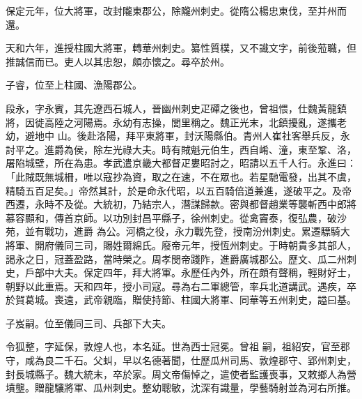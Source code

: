 \begin{pinyinscope}
 保定元年，位大將軍，改封隴東郡公，除隴州刺史。從隋公楊忠東伐，至并州而還。



 天和六年，進授柱國大將軍，轉華州刺史。纂性質樸，又不識文字，前後蒞職，但推誠信而已。吏人以其忠恕，頗亦懷之。尋卒於州。



 子睿，位至上柱國、漁陽郡公。



 段永，字永賓，其先遼西石城人，晉幽州刺史疋磾之後也，曾祖愄，仕魏黃龍鎮將，因徙高陸之河陽焉。永幼有志操，閭里稱之。魏正光末，北鎮擾亂，遂攜老幼，避地中
 山。後赴洛陽，拜平東將軍，封沃陽縣伯。青州人崔社客舉兵反，永討平之。進爵為侯，除左光祿大夫。時有賊魁元伯生，西自崤、潼，東至鞏、洛，屠陷城壁，所在為患。孝武遣京畿大都督疋婁昭討之，昭請以五千人行。永進曰：「此賊既無城柵，唯以寇抄為資，取之在速，不在眾也。若星馳電發，出其不虞，精騎五百足矣。」帝然其計，於是命永代昭，以五百騎倍道兼進，遂破平之。及帝西遷，永時不及從。大統初，乃結宗人，潛謀歸款。密與都督趙業等襲斬西中郎將慕容顯和，傳首京師。以功別封昌平縣子，徐州刺史。從禽竇泰，復弘農，破沙苑，並有戰功，進爵
 為公。河橋之役，永力戰先登，授南汾州刺史。累遷驃騎大將軍、開府儀同三司，賜姓爾綿氏。廢帝元年，授恆州刺史。于時朝貴多其部人，謁永之日，冠蓋盈路，當時榮之。周孝閔帝踐阼，進爵廣城郡公。歷文、瓜二州刺史，戶部中大夫。保定四年，拜大將軍。永歷任內外，所在頗有聲稱，輕財好士，朝野以此重焉。天和四年，授小司寇。尋為右二軍總管，率兵北道講武。遇疾，卒於賀葛城。喪遠，武帝親臨，贈使持節、柱國大將軍、同華等五州刺史，謚曰基。



 子岌嗣。位至儀同三司、兵部下大夫。



 令狐整，字延保，敦煌人也，本名延。世為西士冠冕。曾祖
 嗣，祖紹安，官至郡守，咸為良二千石。父虯，早以名德著聞，仕歷瓜州司馬、敦煌郡守、郢州刺史，封長城縣子。魏大統末，卒於家。周文帝傷悼之，遣使者監護喪事，又敕鄉人為營墳壟。贈龍驤將軍、瓜州刺史。整幼聰敏，沈深有識量，學藝騎射並為河右所推。




\end{pinyinscope}
